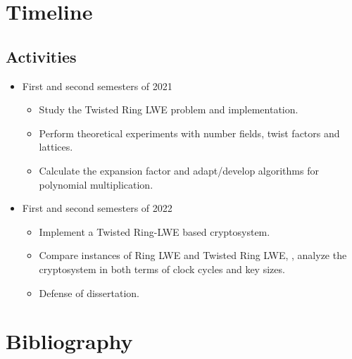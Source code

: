 \documentclass[a4paper,12pt]{article}
\begin{document}
\section{Timeline}
\label{timeline}
\subsection{Activities}
\label{sec:org9085041}
\begin{itemize}
\item First and second semesters of 2021
\begin{itemize}
\item Study the Twisted Ring LWE problem and implementation.
\item Perform theoretical experiments with number fields, twist factors and lattices.
\item Calculate the expansion factor and adapt/develop algorithms for polynomial multiplication.
\end{itemize}
\item First and second semesters of 2022
\begin{itemize}
\item Implement a Twisted Ring-LWE based cryptosystem.
\item Compare instances of Ring LWE and Twisted Ring LWE, \ie, analyze the cryptosystem in both terms of clock cycles and key sizes.
\item Defense of dissertation.
\end{itemize}
\end{itemize}

\section*{Bibliography}
\label{bibliography}


\end{document}
